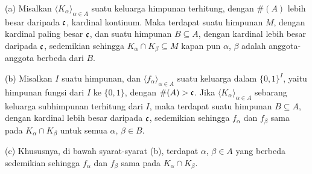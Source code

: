  (a) Misalkan
$\langle K_{\alpha}\rangle_{\alpha\in A}$ suatu keluarga himpunan terhitung,
dengan $\#(A)$ lebih besar daripada $\frak c$, kardinal kontinum.
Maka terdapat suatu himpunan $M$, dengan kardinal paling besar $\frak c$,
dan suatu himpunan $B\subseteq A$, dengan kardinal lebih besar
daripada $\frak c$, sedemikian sehingga
$K_{\alpha}\cap K_{\beta}\subseteq M$ kapan pun $\alpha$, $\beta$ adalah
anggota-anggota berbeda dari $B$.

(b) Misalkan $I$ suatu himpunan, dan
$\langle f_{\alpha}\rangle_{\alpha\in A}$ suatu keluarga dalam
$\{0,1\}^I$, yaitu himpunan fungsi dari $I$ ke $\{0,1\}$, dengan
$\#(A)>\frak c$. Jika $\langle K_{\alpha}\rangle_{\alpha\in A}$ sebarang
keluarga subhimpunan terhitung dari $I$, maka terdapat suatu himpunan
$B\subseteq A$, dengan kardinal lebih besar daripada $\frak c$, sedemikian
sehingga $f_{\alpha}$ dan $f_{\beta}$ sama pada
$K_{\alpha}\cap K_{\beta}$ untuk semua $\alpha$, $\beta\in B$.

(c) Khususnya, di bawah syarat-syarat (b), terdapat $\alpha$,
$\beta\in A$ yang berbeda sedemikian sehingga $f_{\alpha}$ dan $f_{\beta}$
sama pada $K_{\alpha}\cap K_{\beta}$.

